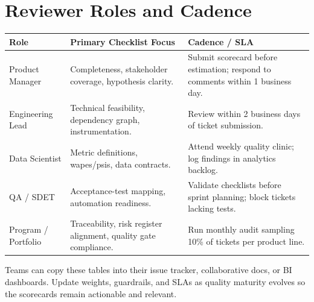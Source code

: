 \section{Reviewer Roles and Cadence}
\begin{longtable}{p{}p{}p{}}
\toprule
\textbf{Role} & \textbf{Primary Checklist Focus} & \textbf{Cadence / SLA}\\
\midrule
Product Manager & Completeness, stakeholder coverage, hypothesis clarity. & Submit scorecard before estimation; respond to comments within 1 business day.\\
Engineering Lead & Technical feasibility, dependency graph, instrumentation. & Review within 2 business days of ticket submission.\\
Data Scientist & Metric definitions, \glspl{wape}/\glspl{psi}, data contracts. & Attend weekly quality clinic; log findings in analytics backlog.\\
QA / SDET & Acceptance-test mapping, automation readiness. & Validate checklists before sprint planning; block tickets lacking tests.\\
Program / Portfolio & Traceability, risk register alignment, quality gate compliance. & Run monthly audit sampling 10\% of tickets per product line.\\
\bottomrule
\end{longtable}

Teams can copy these tables into their issue tracker, collaborative docs, or BI dashboards. Update weights, guardrails, and SLAs as quality maturity evolves so the scorecards remain actionable and relevant.
